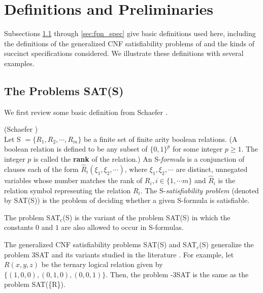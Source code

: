 \section{Definitions and Preliminaries}\label{sec:def}
Subsections  \ref{sec:other_def} through \ref{sec:fpn_spec} give
 basic
definitions used here, 
including the definitions of the generalized {\sf CNF} satisfiability 
problems  of \cite{Sc78} and the kinds of 
succinct specifications considered. We illustrate these definitions with  
several examples.


\subsection{The Problems {\sf SAT(S)}}\label{sec:other_def}
We first review some basic definition  from Schaefer \cite{Sc78}.

\begin{definition}\label{s-formulas:def}(Schaefer \cite{Sc78})\\
Let S $= \{R_1,R_2, \cdots, R_m \}$ be a finite 
set of finite arity boolean
relations. (A boolean relation is defined to be 
any subset of $\{0,1 \}^p$ for some integer $p \geq 1$. 
The integer $p$ is called the  {\bf rank} of the relation.)
An S-{\it formula} is a conjunction of clauses each of the form 
$\hat{R}_i(\xi_1, \xi_2, \cdots)$, where $\xi_1, \xi_2, \cdots$ are distinct, 
unnegated variables whose number matches the 
rank of $R_i, i \in \{ 1, \cdots m \}$ and $\hat{R}_i$ is the relation symbol
representing the relation $R_i$.
The  S-{\it satisfiability problem} (denoted by SAT(S)) 
is the problem of deciding 
whether a given S-formula is satisfiable.

The problem {\sf SAT$_c$(S)} is the variant of the problem 
{\sf SAT(S)} in which the constants $0$ and $1$ are also allowed
to occur in {\sf S-}formulas. 
\end{definition}


The 
generalized {\sf CNF} satisfiability problems {\sf SAT(S)} and 
{\sf SAT$_c$(S)} generalize  the problem  {\sf 3SAT} and its variants
studied in the literature \cite{GJ79}. For example,
let $R(x,y,z)$ be the ternary logical relation  given by
$\{(1,0,0), (0,1,0), (0,0,1) \}$. Then, the problem 
{-3SAT}  is the same as the problem {\sf SAT(\{R\})}. 

\iffalse
Similarly, {\sf NAE3SAT} is the problem of determining if
a {\sf 3CNF} formula, has a satisfying assignment in which all the literals
in any clause are not simultaneously true. 
\fi



